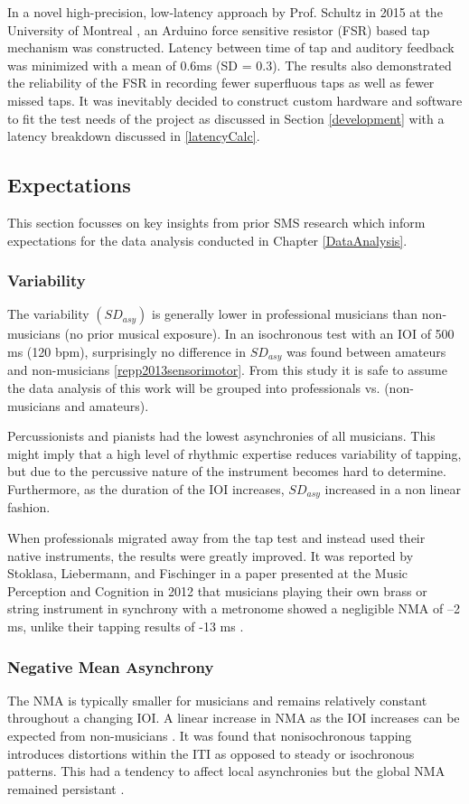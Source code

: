 In a novel high-precision, low-latency approach by Prof. Schultz in 2015 at the University of Montreal \cite{schultz2016tap}, an Arduino force sensitive resistor (FSR) based tap mechanism was constructed. Latency between time of tap and auditory feedback was minimized with a mean of 0.6ms (SD = 0.3). The results also demonstrated the reliability of the FSR in recording fewer superfluous taps as well as fewer missed taps.
It was inevitably decided to construct custom hardware and software to fit the test needs of the project as discussed in Section \ref{development} with a latency breakdown discussed in \ref{latencyCalc}.

\subsection{Expectations} \label{SMSFindings}
This section focusses on key insights from prior SMS research which inform expectations for the data analysis conducted in Chapter \ref{DataAnalysis}.

\subsubsection{Variability}
The variability $(SD_{asy})$ is generally lower in professional musicians than non-musicians (no prior musical exposure). In an isochronous test with an IOI of 500 ms (120 bpm), surprisingly no difference in $SD_{asy}$ was found between amateurs and non-musicians \ref{repp2013sensorimotor}. From this study it is safe to assume the data analysis of this work will be grouped into professionals vs. (non-musicians and amateurs).

Percussionists and pianists had the lowest asynchronies of all musicians. This might imply that a high level of rhythmic expertise reduces variability of tapping, but due to the percussive nature of the instrument becomes hard to determine. Furthermore, as the duration of the IOI increases, $SD_{asy}$ increased in a non linear fashion.

When professionals migrated away from the tap test and instead used their native instruments, the results were greatly improved. It was reported by Stoklasa, Liebermann, and Fischinger in a paper presented at the Music Perception and Cognition in 2012 that musicians playing their own brass or string instrument in synchrony with a metronome showed a negligible NMA of –2  ms, unlike their tapping results of -13 ms \cite{repp2013sensorimotor}.

\subsubsection{Negative Mean Asynchrony}
The NMA is typically smaller for musicians and remains relatively constant throughout a changing IOI. A linear increase in NMA as the IOI increases can be expected from non-musicians \cite{repp2013sensorimotor}. It was found that nonisochronous tapping introduces distortions within the ITI as opposed to steady or isochronous patterns. This had a tendency to affect local asynchronies but the global NMA remained persistant \cite{polak2016both}.
 
